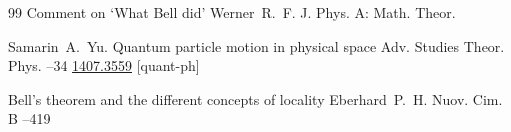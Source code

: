\begin{thebibliography}{99}
\paper Comment on `What Bell did'
\by Werner~R.~F.
\jour J. Phys. A: Math. Theor.

\by Samarin~A.~Yu.
\paper Quantum particle motion in physical space
\jour Adv. Studies Theor. Phys.
--34
\arxiv \href{http://arxiv.org/abs/1407.3559}{1407.3559} [quant-ph]

\paper Bell's theorem and the different concepts of locality
\by Eberhard~P.~H.
\jour Nuov. Cim. B
--419


\end{thebibliography}


\newpage


$\;$



\makerutitle

\vspace{-7mm}






\renewcommand{\baselinestretch}{0.9}

\renewcommand{\RuCitation}{\noindent\textbf{\CYRO\cyrb\cyrr\cyra\cyrz\cyre\cyrc\ \cyrd\cyrl\cyrya\ \cyrc\cyri\cyrt\cyri\cyrr\cyro\cyrv\cyra\cyrn\cyri\cyrya\\} {\RuAuthorInContents} {\RuTitleInContents}~/\!/ \textit{\RuJournalName}, \JournalYear.  \CYRT.~\JournalVolume, \textnumero~\JournalNumber.  \CYRS.~\thefirstpage--\thelastpage. \doiurl.}

\renewcommand{\EnCitation}{\noindent\textbf{Please cite this article in press as:\\} {\EnAuthorInContents} {\EnTitleInContents}, \textit{\EnJournalName}\/ [\ParallelJournalName],  \JournalYear, vol.~\JournalVolume, no.~\JournalNumber,  pp.~\thefirstpage--\thelastpage.  \midoiurl\ (In Russian).}



% 